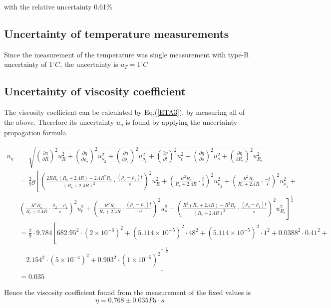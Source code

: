 \documentclass{article}
\begin{document}
with the relative uncertainty 0.61\%

\subsection{Uncertainty of temperature measurements}
Since the measurement of the temperature was single measurement with type-B uncertainty of $1^{\circ}C$, the uncertainty is $u_{T}=1^{\circ}C$

\subsection{Uncertainty of viscosity coefficient}
The viscosity coefficient can be calculated by Eq.(\ref{ETA3}), by measuring all of the above. Therefore its uncertainty $u_{\eta}$ is found by applying the uncertainty propagation formula

\begin{align*}
u_{\eta}&=\sqrt{
	\left(\frac{\partial\eta}{\partial R}\right)^2u^2_R+
	\left(\frac{\partial\eta}{\partial \rho_2}\right)^2u^2_{\rho_2}+
	\left(\frac{\partial\eta}{\partial \rho_1}\right)^2u^2_{\rho_1}+
	\left(\frac{\partial\eta}{\partial t}\right)^2u^2_t+
	\left(\frac{\partial\eta}{\partial s}\right)^2u^2_s+
	\left(\frac{\partial\eta}{\partial R_c}\right)^2u^2_{R_c}
}\\
&=\frac{2}{9}g\left[
	\left(\frac{2RR_c(R_c+2.4R)-2.4R^2R_c}{(R_c+2.4R)^2}\cdot\frac{(\rho_2-\rho_1)t}{s}\right)^2u^2_R+
	\left(\frac{R^2R_c}{R_c+2.4R}\cdot\frac{t}{s}\right)^2u^2_{\rho_2}+
	\left(\frac{R^2R_c}{R_c+2.4R}\cdot\frac{-t}{s}\right)^2u^2_{\rho_1}+\right.\\
&\left.
	\left(\frac{R^2R_c}{R_c+2.4R}\cdot\frac{\rho_2-\rho_1}{s}\right)^2u^2_t+
	\left(\frac{R^2R_c}{R_c+2.4R}\cdot\frac{(\rho_2-\rho_1)t}{-s^2}\right)^2u^2_s+
	\left(\frac{R^2(R_c+2.4R)-R^2R_c}{(R_c+2.4R)^2}\cdot\frac{(\rho_2-\rho_1)t}{s}\right)^2u^2_{R_c}
\right]^{\frac{1}{2}}\\
&=\frac{2}{9}\cdot 9.784\left[682.95^2\cdot(2\times10^{-6})^2+(5.114\times10^{-5})^2\cdot48^2+(5.114\times10^{-5})^2\cdot1^2+0.0388^2\cdot0.41^2+\right.\\
&\quad\left.2.154^2\cdot(5\times10^{-4})^2+0.903^2\cdot(1\times10^{-5})^2\right]^{\frac{1}{2}}\\
&=0.035
\end{align*}

Hence the viscosity coefficient found from the measurement of the fixed values is
$$\eta=0.768\pm0.035Pa\cdot s$$
\end{document}
